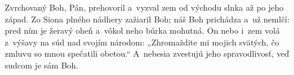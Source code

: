 Zvrchovaný Boh, Pán, prehovoril
a~vyzval zem 
\versseparator
od východu slnka až po jeho západ.
Zo Siona plného nádhery zažiaril Boh;
\versseparator
náš Boh prichádza a~už nemlčí:
\versseparator
pred ním je žeravý oheň
a~vôkol neho búrka mohutná.
\versseparator
On nebo i~zem volá z~výšavy
na súd nad svojím národom:
\versseparator
„Zhromaždite mi mojich svätých,
čo zmluvu so mnou spečatili obetou.“
\versseparator
A~nebesia zvestujú jeho spravodlivosť,
veď sudcom je sám Boh.